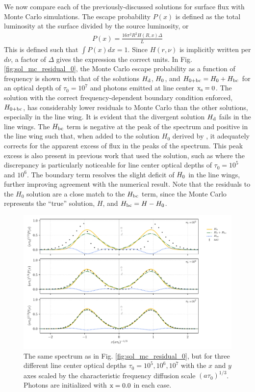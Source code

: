 \documentclass{aastex63}
\newcommand{\be}{\begin{eqnarray}}
\newcommand{\ee}{\end{eqnarray}}
\begin{document}
We now compare each of the previously-discussed solutions for surface flux with Monte Carlo simulations. The escape probability $P(x)$ is defined as the total luminosity at the surface divided by the source luminosity, or
\be
P(x) = \frac{16\pi^2R^2H(R, x)\Delta}{L}
\ee
This is defined such that $\int P(x)dx = 1$. Since $H(r, \nu)$ is implicitly written per $d\nu$, a factor of $\Delta$ gives the expression the correct units. In Fig. \ref{fig:sol_mc_residual_0}, the Monte Carlo escape probability as a function of frequency is shown with that of the solutions $H_{\rm d}$, $H_{\rm 0}$, and $H_{\rm 0 + bc} = H_{\rm 0} + H_{\rm bc}$ for an optical depth of $\tau_0 = 10^7$ and photons emitted at line center $\rm x_s = 0$.  The solution with the correct frequency-dependent boundary condition enforced, $H_{\rm 0 + bc}$, has considerably lower residuals to Monte Carlo than the other solutions, especially in the line wing. It is evident that the divergent solution $H_{\rm d}$ fails in the line wings. The $H_{\rm bc}$ term is negative at the peak of the spectrum and positive in the line wing such that, when added to the solution $H_0$ derived by \citet{2006ApJ...649...14D}, it adequately corrects for the apparent excess of flux in the peaks of the spectrum. This peak excess is also present in previous work that used the \citet{1990ApJ...350..216N} solution, such as \citet{2015MNRAS.449.4336S} where the discrepancy is particularly noticeable for line center optical depths of $\tau_0=10^5$ and $10^6$. The boundary term resolves the slight deficit of $H_{\rm0}$ in the line wings, further improving agreement with the numerical result. Note that the residuals to the $H_0$ solution are a close match to the $H_{\rm bc}$ term, since the Monte Carlo represents the ``true'' solution, $H$, and $H_{\rm bc} = H - H_0$.

 \begin{figure}
    \centering
    \includegraphics{tau_threepanel.pdf}
    \caption{The same spectrum as in Fig. \ref{fig:sol_mc_residual_0}, but for three different line center optical depths $\tau_0 = 10^5, 10^6, 10^7$ with the $x$ and $y$ axes scaled by the characteristic frequency diffusion scale $(a\tau_0)^{1/3}$. Photons are initialized with $\rm x = 0.0$ in each case.} 
    \label{fig:sol_mc_tau}
\end{figure}
\end{document}
